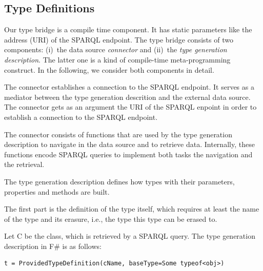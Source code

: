 \documentclass{llncs} %
\newcommand{\ggr}[1]{\textcolor{magenta}{comment Gerd: \textit{#1}}}
\newcommand{\fs}{\textsf{F\#}\xspace}
\begin{document}
\subsection{Type Definitions}

Our type bridge is a compile time component. It has static parameters like
the address (URI) of the SPARQL endpoint.
The type bridge consists of two components: (i)~the data source \emph{connector} and (ii)~the
\emph{type generation description}. The latter one is a kind of compile-time meta-programming construct.
In the following, we consider both components in detail.

The connector establishes a connection to the SPARQL endpoint. It serves as a mediator
between the type generation descrition and the external data source.
The connector gets as an argument the URI of the SPARQL enpoint
in order to establish a connection to the SPARQL endpoint.


The connector consists of functions that are used by the type generation description
to navigate in the data source and to retrieve data. Internally, these functions
encode SPARQL queries to implement both tasks the navigation and the retrieval.

%
%
%





The type generation description defines how types with their parameters,
properties and methods are built.

The first part is the definition of the type itself, which requires at least the
name of the type and its erasure, i.e., the type this type can be erased to.

Let C be the class, which is retrieved by a SPARQL query. The type generation description in \fs
is as follows:

\begin{lstlisting}[style=code, caption={\textbf{Type Rule:} Type Generation Description for RDF Class C}, label={lst:providedClass}]
t = ProvidedTypeDefinition(cName, baseType=Some typeof<obj>)
\end{lstlisting}
\end{document}
